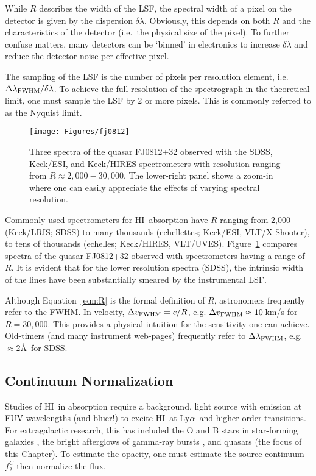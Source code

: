 \documentclass[graybox]{svmult}
\newcommand{\HI}{H{\sc I}}
\def\lya{Ly$\alpha$}
\begin{document}
While $R$ describes the width of the LSF, the spectral
width of a pixel on the detector is given by the dispersion
$\delta \lambda$.  Obviously, this depends on both $R$ 
and the characteristics of the detector (i.e.\ the
physical size of the pixel).  To further confuse matters,
many detectors can be `binned' in electronics
to increase $\delta\lambda$ and reduce the detector noise
per effective pixel.  

The sampling of the LSF is the number of pixels per resolution element,
i.e.\  $\Delta\lambda_{\rm FWHM} / \delta\lambda$.  To achieve the
full resolution of the spectrograph in the theoretical limit,
one must sample the LSF by 2 or more pixels.  This is commonly
referred to as the Nyquist limit.  


%
\begin{figure}[b]
\sidecaption
\texttt{[image: Figures/fj0812]}
%
%
\caption{Three spectra of the quasar FJ0812+32 observed with the
SDSS, Keck/ESI, and Keck/HIRES spectrometers with resolution ranging
from $R \approx 2,000 - 30,000$.  The lower-right panel shows
a zoom-in where one can easily appreciate the effects of varying
spectral resolution.
}
\label{fig:R}       %
\end{figure}

Commonly used spectrometers for \HI\ absorption have $R$ ranging
from 2,000 (Keck/LRIS; SDSS) to many thousands (echellettes; 
Keck/ESI, VLT/X-Shooter), to tens of thousands
(echelles; Keck/HIRES, VLT/UVES).  Figure~\ref{fig:R}
compares spectra of the quasar FJ0812+32 observed
with spectrometers having a range of $R$.  It is evident
that for the lower resolution spectra (SDSS), the intrinsic
width of the lines have been substantially smeared by the 
instrumental LSF.

Although Equation~\ref{eqn:R} is the formal definition of $R$,
astronomers frequently refer to the FWHM.  In velocity,
$\Delta v_{\rm FWHM} = c/R$, e.g. 
$\Delta v_{\rm FWHM} \approx 10$\,km/s for $R = 30,000$.
This provides a physical intuition for the sensitivity
one can achieve.  Old-timers (and many instrument web-pages)
frequently refer to $\Delta \lambda_{\rm FWHM}$, e.g.\ $\approx 2$\AA\
for SDSS.

\subsection{Continuum Normalization}
Studies of \HI\ in absorption require a background, light source
with emission at FUV wavelengths (and bluer!) to excite \HI\
at \lya\ and higher order transitions.
For extragalactic research, this has included the O and B stars
in star-forming galaxies \cite{lee+14}, the bright afterglows
of gamma-ray bursts \cite{fjp+09}, and quasars (the focus
of this Chapter).   To estimate the opacity, one must estimate
the source continuum $f^C_\lambda$ then normalize the flux, 
\end{document}
